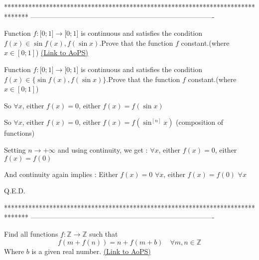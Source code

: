 *******************************************************************************
-------------------------------------------------------------------------------

\begin{problem}
	Function ${{f: \mathbb[0;1]}\to\mathbb[0;1]}$ is continuous and satisfies the condition $f(x){\in}{\sin{f(x)},f(\sin{x})}$.Prove that the function $f$ constant.(where $x{\in}[0;1]$)
	\flushright \href{https://artofproblemsolving.com/community/c6h569375}{(Link to AoPS)}
\end{problem}



\begin{solution}
	\begin{tcolorbox}Function ${{f: \mathbb[0;1]}\to\mathbb[0;1]}$ is continuous and satisfies the condition $f(x){\in}\{\sin{f(x)},f(\sin{x})\}$.Prove that the function $f$ constant.(where $x{\in}[0;1]$)\end{tcolorbox}
So $\forall x$, either $f(x)=0$, either $f(x)=f(\sin x)$

So $\forall x$, either $f(x)=0$, either $f(x)=f(\sin^{[n]}x)$ (composition of functions)

Setting $n\to+\infty$ and using continuity, we get :
$\forall x$, either $f(x)=0$, either $f(x)=f(0)$

And continuity again implies : 
Either $f(x)=0$ $\forall x$, either $f(x)=f(0)$ $\forall x$

Q.E.D.
\end{solution}
*******************************************************************************
-------------------------------------------------------------------------------

\begin{problem}
	Find all functions $f: \mathbb{Z}\to\mathbb{Z}$ such that \[f(m+f(n))=n+f(m+b)\quad \forall m,n\in\mathbb Z\]
Where $b$ is a given real number.
	\flushright \href{https://artofproblemsolving.com/community/c6h569379}{(Link to AoPS)}
\end{problem}



